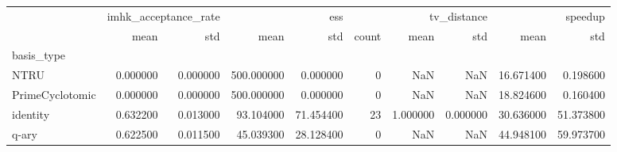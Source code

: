 \begin{tabular}{lrrrrrrrrr}
\toprule
 & \multicolumn{2}{r}{imhk_acceptance_rate} & \multicolumn{2}{r}{ess} & \multicolumn{3}{r}{tv_distance} & \multicolumn{2}{r}{speedup} \\
 & mean & std & mean & std & count & mean & std & mean & std \\
basis_type &  &  &  &  &  &  &  &  &  \\
\midrule
NTRU & 0.000000 & 0.000000 & 500.000000 & 0.000000 & 0 & NaN & NaN & 16.671400 & 0.198600 \\
PrimeCyclotomic & 0.000000 & 0.000000 & 500.000000 & 0.000000 & 0 & NaN & NaN & 18.824600 & 0.160400 \\
identity & 0.632200 & 0.013000 & 93.104000 & 71.454400 & 23 & 1.000000 & 0.000000 & 30.636000 & 51.373800 \\
q-ary & 0.622500 & 0.011500 & 45.039300 & 28.128400 & 0 & NaN & NaN & 44.948100 & 59.973700 \\
\bottomrule
\end{tabular}

